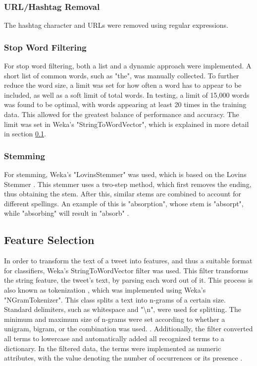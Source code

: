 \subsubsection{URL/Hashtag Removal}
The hashtag character and URLs were removed using regular expressions.

\subsubsection{Stop Word Filtering}
For stop word filtering, both a list and a dynamic approach were implemented. A short list of common words, such as "the", was manually collected. To further reduce the word size, a limit was set for how often a word has to appear to be included, as well as a soft limit of total words. In testing, a limit of 15,000 words was found to be optimal, with words appearing at least 20 times in the training data. This allowed for the greatest balance of performance and accuracy. The limit was set in Weka's "StringToWordVector", which is explained in more detail in section \ref{sub:feature_selec}.

\subsubsection{Stemming}
For stemming, Weka's "LovinsStemmer" was used, which is based on the Lovins Stemmer \cite{Weka}. This stemmer uses a two-step method, which first removes the ending, thus obtaining the stem. After this, similar stems are combined to account for different spellings. An example of this is "absorption", whose stem is "absorpt", while "absorbing" will result in "absorb" \cite{Lovins1968DevelopmentOA}.

\subsection{Feature Selection}
\label{sub:feature_selec}


In order to transform the text of a tweet into features, and thus a suitable format for classifiers, Weka's StringToWordVector filter was used. This filter transforms the string feature, the tweet's text, by parsing each word out of it. This process is also known as tokenization \cite{DBLP:journals/csur/GiachanouC16}, which was implemented using Weka's "NGramTokenizer". This class splits a text into n-grams of a certain size. Standard delimiters, such as whitespace and "\textbackslash n", were used for splitting. The minimum and maximum size of n-grams were set according to whether a unigram, bigram, or the combination was used. \cite{Weka}. Additionally, the filter converted all terms to lowercase and automatically added all recognized terms to a dictionary. In the filtered data, the terms were implemented as numeric attributes, with the value denoting the number of occurrences or its presence \cite{Weka}.


